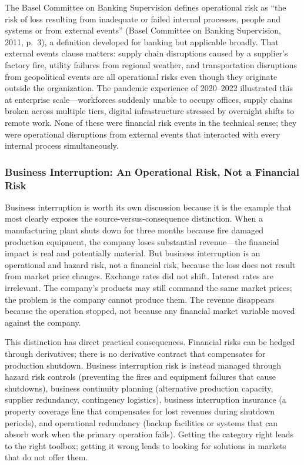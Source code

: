 \documentclass[11pt,openany]{book}
\begin{document}
The Basel Committee on Banking Supervision defines operational risk as ``the risk of loss resulting from inadequate or failed internal processes, people and systems or from external events'' (Basel Committee on Banking Supervision, 2011, p.~3), a definition developed for banking but applicable broadly. That external events clause matters: supply chain disruptions caused by a supplier's factory fire, utility failures from regional weather, and transportation disruptions from geopolitical events are all operational risks even though they originate outside the organization. The pandemic experience of 2020--2022 illustrated this at enterprise scale---workforces suddenly unable to occupy offices, supply chains broken across multiple tiers, digital infrastructure stressed by overnight shifts to remote work. None of these were financial risk events in the technical sense; they were operational disruptions from external events that interacted with every internal process simultaneously.

\subsubsection{Business Interruption: An Operational Risk, Not a Financial Risk}
\label{subsubsec:business-interruption}

Business interruption is worth its own discussion because it is the example that most clearly exposes the source-versus-consequence distinction. When a manufacturing plant shuts down for three months because fire damaged production equipment, the company loses substantial revenue---the financial impact is real and potentially material. But business interruption is an operational and hazard risk, not a financial risk, because the loss does not result from market price changes. Exchange rates did not shift. Interest rates are irrelevant. The company's products may still command the same market prices; the problem is the company cannot produce them. The revenue disappears because the operation stopped, not because any financial market variable moved against the company.

This distinction has direct practical consequences. Financial risks can be hedged through derivatives; there is no derivative contract that compensates for production shutdown. Business interruption risk is instead managed through hazard risk controls (preventing the fires and equipment failures that cause shutdowns), business continuity planning (alternative production capacity, supplier redundancy, contingency logistics), business interruption insurance (a property coverage line that compensates for lost revenues during shutdown periods), and operational redundancy (backup facilities or systems that can absorb work when the primary operation fails). Getting the category right leads to the right toolbox; getting it wrong leads to looking for solutions in markets that do not offer them.
\end{document}
